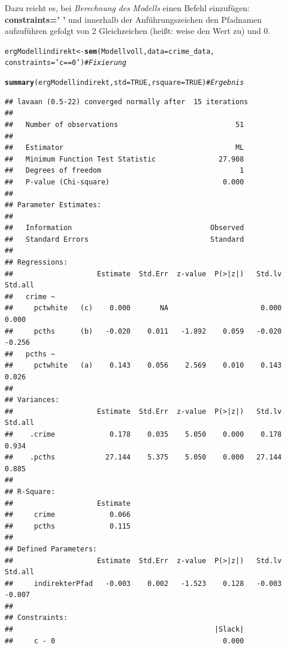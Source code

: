 \documentclass[a4paper]{article}\usepackage[]{graphicx}\usepackage[]{color}
\makeatletter
\newcommand{\hlnum}[1]{\textcolor[rgb]{0.686,0.059,0.569}{#1}}%
\newcommand{\hlstr}[1]{\textcolor[rgb]{0.192,0.494,0.8}{#1}}%
\newcommand{\hlcom}[1]{\textcolor[rgb]{0.678,0.584,0.686}{\textit{#1}}}%
\newcommand{\hlstd}[1]{\textcolor[rgb]{0.345,0.345,0.345}{#1}}%
\newcommand{\hlkwb}[1]{\textcolor[rgb]{0.69,0.353,0.396}{#1}}%
\newcommand{\hlkwc}[1]{\textcolor[rgb]{0.333,0.667,0.333}{#1}}%
\newcommand{\hlkwd}[1]{\textcolor[rgb]{0.737,0.353,0.396}{\textbf{#1}}}%
\newenvironment{kframe}{%
 \def\at@end@of@kframe{}%
 \ifinner\ifhmode%
  \def\at@end@of@kframe{\end{minipage}}%
  \begin{minipage}{\columnwidth}%
 \fi\fi%
 \def\FrameCommand##1{\hskip\@totalleftmargin \hskip-\fboxsep
 \colorbox{shadecolor}{##1}\hskip-\fboxsep
     \hskip-\linewidth \hskip-\@totalleftmargin \hskip\columnwidth}%
 \MakeFramed {\advance\hsize-\width
   \@totalleftmargin\z@ \linewidth\hsize
   \@setminipage}}%
 {\par\unskip\endMakeFramed%
 \at@end@of@kframe}
\newenvironment{knitrout}{}{} %
\makeatother
\begin{document}
Dazu reicht es, bei \textit{Berechnung des Modells} einen Befehl einzufügen: \textbf{constraints=' '} und innerhalb der Anführungszeichen den Pfadnamen aufzuführen gefolgt von 2 Gleichzeichen (heißt: weise den Wert zu) und 0.
\begin{knitrout}
\color{fgcolor}\begin{kframe}
\begin{alltt}
\hlstd{ergModellindirekt} \hlkwb{<-} \hlkwd{sem}\hlstd{(Modellvoll,} \hlkwc{data} \hlstd{= crime_data,}
                         \hlkwc{constraints}\hlstd{=}\hlstr{'c==0'}\hlstd{)} \hlcom{# Fixierung}

\hlkwd{summary}\hlstd{(ergModellindirekt,} \hlkwc{std}\hlstd{=}\hlnum{TRUE}\hlstd{,} \hlkwc{rsquare}\hlstd{=}\hlnum{TRUE}\hlstd{)} \hlcom{# Ergebnis}
\end{alltt}
\begin{verbatim}
## lavaan (0.5-22) converged normally after  15 iterations
## 
##   Number of observations                            51
## 
##   Estimator                                         ML
##   Minimum Function Test Statistic               27.908
##   Degrees of freedom                                 1
##   P-value (Chi-square)                           0.000
## 
## Parameter Estimates:
## 
##   Information                                 Observed
##   Standard Errors                             Standard
## 
## Regressions:
##                    Estimate  Std.Err  z-value  P(>|z|)   Std.lv  Std.all
##   crime ~                                                               
##     pctwhite   (c)    0.000       NA                      0.000    0.000
##     pcths      (b)   -0.020    0.011   -1.892    0.059   -0.020   -0.256
##   pcths ~                                                               
##     pctwhite   (a)    0.143    0.056    2.569    0.010    0.143    0.026
## 
## Variances:
##                    Estimate  Std.Err  z-value  P(>|z|)   Std.lv  Std.all
##    .crime             0.178    0.035    5.050    0.000    0.178    0.934
##    .pcths            27.144    5.375    5.050    0.000   27.144    0.885
## 
## R-Square:
##                    Estimate
##     crime             0.066
##     pcths             0.115
## 
## Defined Parameters:
##                    Estimate  Std.Err  z-value  P(>|z|)   Std.lv  Std.all
##     indirekterPfad   -0.003    0.002   -1.523    0.128   -0.003   -0.007
## 
## Constraints:
##                                                |Slack|
##     c - 0                                        0.000
\end{verbatim}
\end{kframe}
\end{knitrout}
\end{document}
